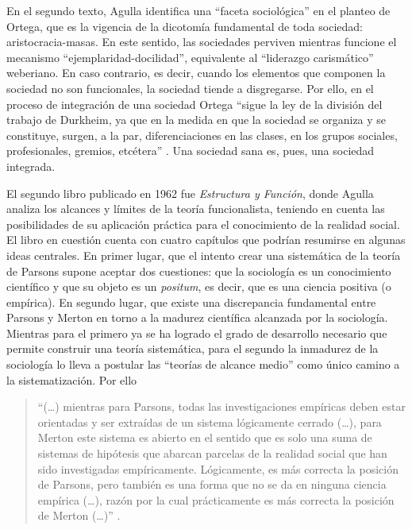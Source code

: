 En el segundo texto, Agulla identifica una \enquote{faceta sociológica} en el planteo de Ortega, que es la vigencia de la dicotomía fundamental de toda sociedad: aristocracia-masas. En este sentido, las sociedades perviven mientras funcione el mecanismo \enquote{ejemplaridad-docilidad}, equivalente al \enquote{liderazgo carismático} weberiano. En caso contrario, es decir, cuando los elementos que componen la sociedad no son funcionales, la sociedad tiende a disgregarse. Por ello, en el proceso de integración de una sociedad Ortega \enquote{sigue la ley de la división del trabajo de Durkheim, ya que en la medida en que la sociedad se organiza y se constituye, surgen, a la par, diferenciaciones en las clases, en los grupos sociales, profesionales, gremios, etcétera} \parencite[61-62]{1639-AGULLA1962}. Una sociedad sana es, pues, una sociedad integrada.

El segundo libro publicado en 1962 fue \emph{Estructura y Función}, donde Agulla analiza los alcances y límites de la teoría funcionalista, teniendo en cuenta las posibilidades de su aplicación práctica para el conocimiento de la realidad social. El libro en cuestión cuenta con cuatro capítulos que podrían resumirse en algunas ideas centrales. En primer lugar, que el intento crear una sistemática de la teoría de Parsons supone aceptar dos cuestiones: que la sociología es un conocimiento científico y que su objeto es un \emph{positum}, es decir, que es una ciencia positiva (o empírica). En segundo lugar, que existe una discrepancia fundamental entre Parsons y Merton en torno a la madurez científica alcanzada por la sociología. Mientras para el primero ya se ha logrado el grado de desarrollo necesario que permite construir una teoría sistemática, para el segundo la inmadurez de la sociología lo lleva a postular las \enquote{teorías de alcance medio} como único camino a la sistematización. Por ello

\begin{quote}
\enquote{(\dots) mientras para Parsons, todas las investigaciones empíricas deben estar orientadas y ser extraídas de un sistema lógicamente cerrado (\dots), para Merton este sistema es abierto en el sentido que es solo una suma de sistemas de hipótesis que abarcan parcelas de la realidad social que han sido investigadas empíricamente. Lógicamente, es más correcta la posición de Parsons, pero también es una forma que no se da en ninguna ciencia empírica (\dots), razón por la cual prácticamente es más correcta la posición de Merton (\dots)} \parencite[57]{1640-AGULLA1962}.
\end{quote}

